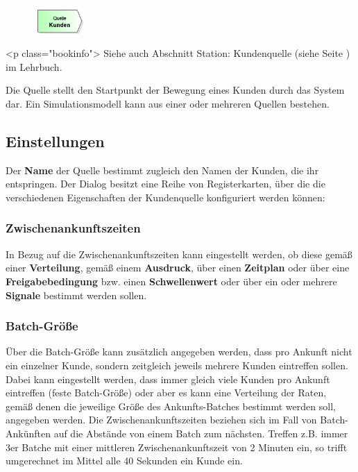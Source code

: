 \begin{figure}
\vspace{-22pt}
\includegraphics[width=2cm]{imageModelElementSource.png}
\vspace{-22pt}
\end{figure}

<p class="bookinfo">
Siehe auch Abschnitt Station: Kundenquelle (siehe Seite \pageref{ref:book:5.3.1}) im Lehrbuch.

Die Quelle stellt den Startpunkt der Bewegung eines Kunden durch das System dar.
Ein Simulationsmodell kann aus einer oder mehreren Quellen bestehen.

\subsection*{Einstellungen}

Der \textbf{Name} der Quelle bestimmt zugleich den Namen der Kunden, die ihr entspringen.
Der Dialog besitzt eine Reihe von Registerkarten, über die die verschiedenen Eigenschaften
der Kundenquelle konfiguriert werden können:

\subsubsection*{Zwischenankunftszeiten}

In Bezug auf die Zwischenankunftszeiten kann eingestellt werden, ob diese gemäß einer
\textbf{Verteilung}, gemäß einem \textbf{Ausdruck}, über einen \textbf{Zeitplan} oder über eine
\textbf{Freigabebedingung} bzw. einen \textbf{Schwellenwert} oder über
ein oder mehrere \textbf{Signale} bestimmt werden sollen.

\subsubsection*{Batch-Größe}

Über die Batch-Größe kann zusätzlich
angegeben werden, dass pro Ankunft nicht ein einzelner Kunde, sondern zeitgleich jeweils
mehrere Kunden eintreffen sollen. Dabei kann eingestellt werden, dass immer gleich
viele Kunden pro Ankunft eintreffen (feste Batch-Größe) oder aber es kann eine Verteilung
der Raten, gemäß denen die jeweilige Größe des Ankunfts-Batches bestimmt werden soll,
angegeben werden.
Die Zwischenankunftszeiten beziehen sich im Fall von Batch-Ankünften auf die Abstände von
einem Batch zum nächsten. Treffen z.B. immer 3er Batche mit einer mittleren Zwischenankunftszeit
von 2 Minuten ein, so trifft umgerechnet im Mittel alle 40 Sekunden ein Kunde ein.

